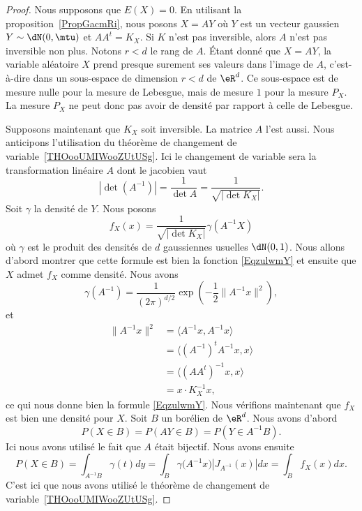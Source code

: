 \begin{proof}
	Nous supposons que \( E(X)=0\). En utilisant la proposition~\ref{PropGacmRi}, nous posons \( X=AY\) où \( Y\) est un vecteur gaussien \( Y\sim\dN(0,\mtu)\) et \( AA^t=K_X\). Si \( K\) n'est pas inversible, alors \( A\) n'est pas inversible non plus. Notons \( r<d\) le rang de \( A\). Étant donné que \( X=AY\), la variable aléatoire \( X\) prend presque surement ses valeurs dans l'image de \( A\), c'est-à-dire dans un sous-espace de dimension \( r<d\) de \( \eR^d\). Ce sous-espace est de mesure nulle pour la mesure de Lebesgue, mais de mesure \( 1\) pour la mesure \( P_X\). La mesure \( P_X\) ne peut donc pas avoir de densité par rapport à celle de Lebesgue.

	Supposons maintenant que \( K_X\) soit inversible. La matrice \( A\) l'est aussi. Nous anticipons l'utilisation du théorème de changement de variable~\ref{THOooUMIWooZUtUSg}. Ici le changement de variable sera la transformation linéaire \( A\) dont le jacobien vaut
	\begin{equation}
		| \det(A^{-1}) |=\frac{1}{ \det A }=\frac{1}{ \sqrt{| \det K_X |} }.
	\end{equation}
	Soit \( \gamma\) la densité de \( Y\). Nous posons
	\begin{equation}
		f_X(x)=\frac{1}{\sqrt{| \det K_X |}} \gamma(A^{-1} X)
	\end{equation}
	où \( \gamma\) est le produit des densités de \( d\) gaussiennes usuelles \( \dN(0,1)\). Nous allons d'abord montrer que cette formule est bien la fonction \eqref{EqzulwmY} et ensuite que \( X\) admet \( f_X\) comme densité. Nous avons
	\begin{equation}
		\gamma(A^{-1})=\frac{1}{ (2\pi)^{d/2} }\exp\left( -\frac{ 1 }{2}\| A^{-1}x \|^2 \right),
	\end{equation}
	et
	\begin{subequations}
		\begin{align}
			\| A^{-1}x \|^2 & =\langle A^{-1}x, A^{-1}x\rangle     \\
			                & =\langle (A^{-1})^tA^{-1}x, x\rangle \\
			                & =\langle (AA^t)^{-1}x, x\rangle      \\
			                & =x\cdot K_X^{-1}x,
		\end{align}
	\end{subequations}
	ce qui nous donne bien la formule \eqref{EqzulwmY}. Nous vérifions maintenant que \( f_X\) est bien une densité pour \( X\). Soit \( B\) un borélien de \( \eR^d\). Nous avons d'abord
	\begin{equation}
		P(X\in B)=P(AY\in B)=P(Y\in A^{-1}B).
	\end{equation}
	Ici nous avons utilisé le fait que \( A\) était bijectif. Nous avons ensuite
	\begin{equation}
		P(X\in B)=\int_{A^{-1}B}\gamma(t)dy
		=\int_B\gamma\big( A^{-1}x \big)| J_{A^{-1}}(x) |dx
		=\int_Bf_X(x)dx.
	\end{equation}
	C'est ici que nous avons utilisé le théorème de changement de variable~\ref{THOooUMIWooZUtUSg}.
\end{proof}

